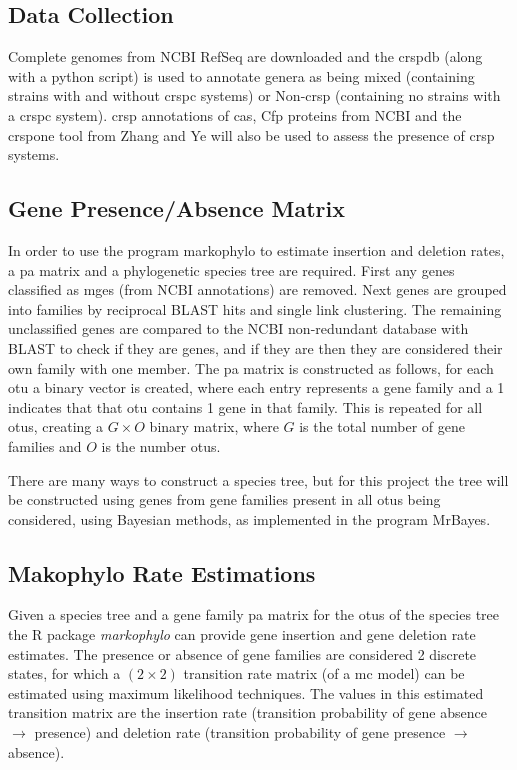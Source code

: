 \documentclass[12pt,letter]{article}
\begin{document}
\subsection*{Data Collection}
Complete genomes from NCBI RefSeq are downloaded and the \ac{crsp}db (along with a python script) is used to annotate genera as being mixed (containing strains with and without \ac{crspc} systems) or Non-\ac{crsp} (containing no strains with a \ac{crspc} system)\citep{crispdb}.
\ac{crsp} annotations of \ac{cas}, Cfp proteins from NCBI and the \ac{crsp}one tool from Zhang and Ye will also be used to assess the presence of \ac{crsp} systems\citep{ineqcas}.
\subsection*{Gene Presence/Absence Matrix}
In order to use the program markophylo to estimate insertion and deletion rates, a \ac{pa} matrix and a phylogenetic species tree are required.
First any genes classified as \ac{mge}s (from NCBI annotations) are removed.
Next genes are grouped into families by reciprocal BLAST hits and single link clustering.
The remaining unclassified genes are compared to the NCBI non-redundant database with BLAST to check if they are genes, and if they are then they are considered their own family with one member.
The \ac{pa} matrix is constructed as follows, for each \ac{otu} a binary vector is created, where each entry represents a gene family and a 1 indicates that that \ac{otu} contains 1 gene in that family.
This is repeated for all \ac{otu}s, creating a $G \times O$ binary matrix, where $G$ is the total number of gene families and $O$ is the number \ac{otu}s.\par
There are many ways to construct a species tree, but for this project the tree will be constructed using genes from gene families present in all \ac{otu}s being considered, using Bayesian methods, as implemented in the program MrBayes.
\subsection*{Makophylo Rate Estimations}
Given a species tree and a gene family \ac{pa} matrix for the \ac{otu}s of the species tree the R package \textit{markophylo} can provide gene insertion and gene deletion rate estimates\citep{marko}.
The presence or absence of gene families are considered 2 discrete states, for which a $(2\times 2)$ transition rate matrix (of a \ac{mc} model) can be estimated using maximum likelihood techniques.
The values in this estimated transition matrix are the insertion rate (transition probability of gene absence $\to$ presence) and deletion rate (transition probability of gene presence $\to$ absence)\citep{marko}.
\end{document}
